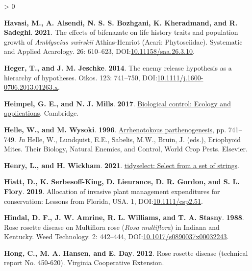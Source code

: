 \documentclass{ufdissertation}[overrideChapters] %
\newlength{\cslhangindent}
\newenvironment{CSLReferences}[2] %
 {%
  \setlength{\parindent}{0pt}
  \ifodd #1 \everypar{\setlength{\hangindent}{\cslhangindent}}\ignorespaces\fi
  \ifnum #2 > 0
  \setlength{\parskip}{#2\baselineskip}
  \fi
 }%
 {}
\begin{document}
{\begin{CSLReferences}{1}{1}
\leavevmode{}%
\textbf{Havasi, M., A. Alsendi, N. S. S. Bozhgani, K. Kheradmand, and R. Sadeghi}. \textbf{2021}. The effects of bifenazate on life history traits and population growth of {\emph{Amblyseius swirskii}} {Athias-Henriot} ({Acari}: {Phytoseiidae}). Systematic and Applied Acarology. 26: 610--623, DOI:\href{https://doi.org/10.11158/saa.26.3.10}{10.11158/saa.26.3.10}.

\leavevmode{}%
\textbf{Heger, T., and J. M. Jeschke}. \textbf{2014}. The enemy release hypothesis as a hierarchy of hypotheses. Oikos. 123: 741--750, DOI:\href{https://doi.org/10.1111/j.1600-0706.2013.01263.x}{10.1111/j.1600-0706.2013.01263.x}.

\leavevmode{}%
\textbf{Heimpel, G. E., and N. J. Mills}. \textbf{2017}. \href{https://www.ebook.de/de/product/28005981/george_e_heimpel_nicholas_j_mills_biological_control_ecology_and_applications.html}{Biological control: Ecology and applications}. Cambridge.

\leavevmode{}%
\textbf{Helle, W., and M. Wysoki}. \textbf{1996}. \href{https://doi.org/10.1016/s1572-4379(96)80050-9}{Arrhenotokous parthenogenesis}, pp. 741--749. \emph{In} Helle, W., Lundquist, E.E., Sabelis, M.W., Bruin, J. (eds.), Eriophyoid Mites. Their Biology, Natural Enemies, and Control, World Crop Pests. Elsevier.

\leavevmode{}%
\textbf{Henry, L., and H. Wickham}. \textbf{2021}. \href{https://CRAN.R-project.org/package=tidyselect}{{tidyselect:} Select from a set of strings}.

\leavevmode{}%
\textbf{Hiatt, D., K. Serbesoff-King, D. Lieurance, D. R. Gordon, and S. L. Flory}. \textbf{2019}. Allocation of invasive plant management expenditures for conservation: Lessons from {Florida}, {USA}. 1, DOI:\href{https://doi.org/10.1111/csp2.51}{10.1111/csp2.51}.

\leavevmode{}%
\textbf{Hindal, D. F., J. W. Amrine, R. L. Williams, and T. A. Stasny}. \textbf{1988}. {Rose rosette disease} on {Multiflora rose} ({\emph{Rosa multiflora}}) in {Indiana} and {Kentucky}. Weed Technology. 2: 442--444, DOI:\href{https://doi.org/10.1017/s0890037x00032243}{10.1017/s0890037x00032243}.

\leavevmode{}%
\textbf{Hong, C., M. A. Hansen, and E. Day}. \textbf{2012}. {Rose rosette disease} (technical report No. 450-620). Virginia Cooperative Extension.


\end{CSLReferences}}
\end{document}
